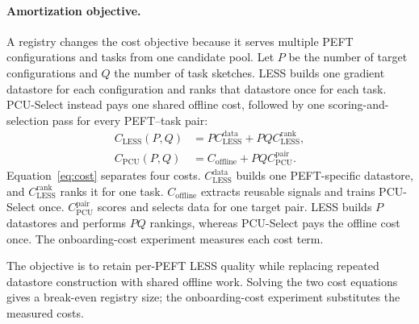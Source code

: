 \paragraph{Amortization objective.}
A registry changes the cost objective because it serves multiple PEFT configurations and tasks from one candidate pool. Let $P$ be the number of target configurations and $Q$ the number of task sketches. LESS builds one gradient datastore for each configuration and ranks that datastore once for each task. PCU-Select instead pays one shared offline cost, followed by one scoring-and-selection pass for every PEFT--task pair:
\begin{equation}
  \begin{aligned}
  C_{\mathrm{LESS}}(P,Q)
    &=P C^{\mathrm{data}}_{\mathrm{LESS}}+
      PQ C^{\mathrm{rank}}_{\mathrm{LESS}},\\
  C_{\mathrm{PCU}}(P,Q)
    &=C_{\mathrm{offline}}+PQ C^{\mathrm{pair}}_{\mathrm{PCU}}.
  \end{aligned}
  \label{eq:cost}
\end{equation}
Equation~\eqref{eq:cost} separates four costs. $C^{\mathrm{data}}_{\mathrm{LESS}}$ builds one PEFT-specific datastore, and $C^{\mathrm{rank}}_{\mathrm{LESS}}$ ranks it for one task. $C_{\mathrm{offline}}$ extracts reusable signals and trains PCU-Select once. $C^{\mathrm{pair}}_{\mathrm{PCU}}$ scores and selects data for one target pair. LESS builds $P$ datastores and performs $PQ$ rankings, whereas PCU-Select pays the offline cost once. The onboarding-cost experiment measures each cost term.

The objective is to retain per-PEFT LESS quality while replacing repeated datastore construction with shared offline work. Solving the two cost equations gives a break-even registry size; the onboarding-cost experiment substitutes the measured costs.
